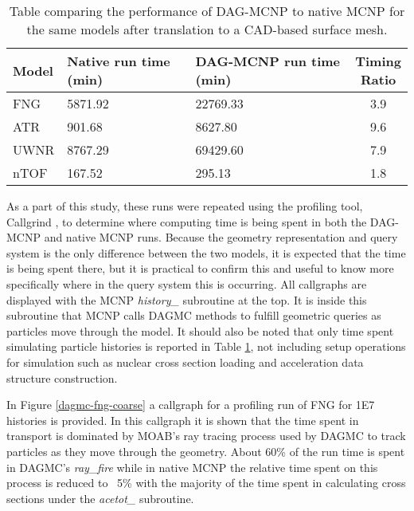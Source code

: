 \begin{table}[H]
  \centering
  \begin{tabular}{l l l c}
    \toprule
    Model & Native run time (min) & DAG-MCNP run time (min) & \thead{Timing \\ Ratio} \\
    \hline
    FNG   & 5871.92           & 22769.33            & 3.9   \\
    ATR   & 901.68            & 8627.80             & 9.6   \\
    UWNR  & 8767.29           & 69429.60            & 7.9   \\
    nTOF  & 167.52            & 295.13              & 1.8   \\
    \hline
  \end{tabular}
  \caption[DAG-MCNP performance benchmarking.]{Table comparing the performance of DAG-MCNP to native MCNP for the
    same models after translation to a CAD-based surface mesh.}
  \label{dag-mcnp-benchmarks}  
\end{table}

As a part of this study, these runs were repeated using the profiling tool,
Callgrind \cite{Pena_2016}, to determine where computing time is being spent in
both the DAG-MCNP and native MCNP runs. Because the geometry representation and
query system is the only difference between the two models, it is expected that
the time is being spent there, but it is practical to confirm this and useful to
know more specifically where in the query system this is occurring. All
callgraphs are displayed with the MCNP \textit{history\_} subroutine at the
top. It is inside this subroutine that MCNP calls DAGMC methods to fulfill geometric
queries as particles move through the model. It should also be noted that only time spent simulating
particle histories is reported in Table \ref{dag-mcnp-benchmarks}, not including
setup operations for simulation such as nuclear cross section loading and
acceleration data structure construction.

In Figure \ref{dagmc-fng-coarse} a callgraph for a profiling run of FNG for \num{1E7}
histories is provided. In this callgraph it is shown that the time spent in
transport is dominated by MOAB's ray tracing process used by DAGMC to track
particles as they move through the geometry. About 60\% of the run time  is spent
in DAGMC's \textit{ray\_fire} while in native MCNP the relative time spent on
this process is reduced to ~5\% with the majority of the time spent in
calculating cross sections under the \textit{acetot\_} subroutine.

